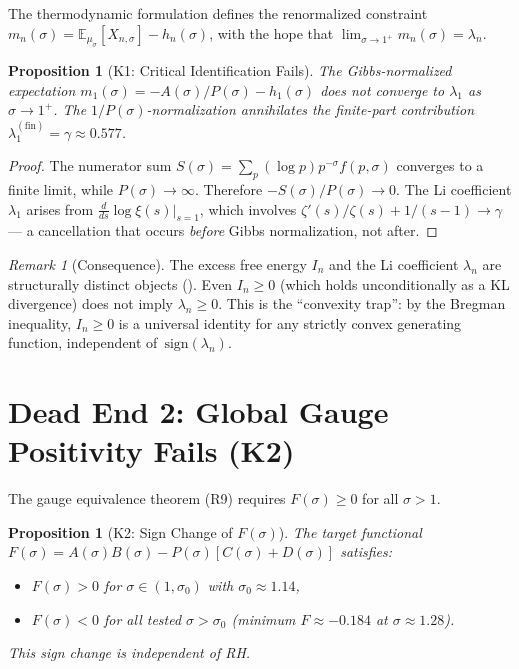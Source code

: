 \documentclass[12pt,a4paper]{article}
\newtheorem{proposition}[theorem]{Proposition}
\theoremstyle{definition}
\theoremstyle{remark}
\newtheorem{remark}[theorem]{Remark}
\newcommand{\EE}{\mathbb{E}}
\newcommand{\muG}{\mu_\sigma}
\begin{document}
The thermodynamic formulation defines the renormalized constraint $m_n(\sigma) = \EE_{\muG}[X_{n,\sigma}] - h_n(\sigma)$, with the hope that $\lim_{\sigma \to 1^+} m_n(\sigma) = \lambda_n$.

\begin{proposition}[K1: Critical Identification Fails]
\label{prop:K1}
The Gibbs-normalized expectation $m_1(\sigma) = -A(\sigma)/P(\sigma) - h_1(\sigma)$ does \emph{not} converge to $\lambda_1$ as $\sigma \to 1^+$. The $1/P(\sigma)$-normalization annihilates the finite-part contribution $\lambda_1^{(\mathrm{fin})} = \gamma \approx 0.577$.
\end{proposition}

\begin{proof}
The numerator sum $S(\sigma) = \sum_p (\log p)p^{-\sigma}f(p,\sigma)$ converges to a finite limit, while $P(\sigma) \to \infty$. Therefore $-S(\sigma)/P(\sigma) \to 0$. The Li coefficient $\lambda_1$ arises from $\frac{d}{ds}\log\xi(s)|_{s=1}$, which involves $\zeta'(s)/\zeta(s) + 1/(s-1) \to \gamma$ --- a cancellation that occurs \emph{before} Gibbs normalization, not after.
\end{proof}

\begin{remark}[Consequence]
The excess free energy $I_n$ and the Li coefficient $\lambda_n$ are structurally distinct objects (). Even $I_n \geq 0$ (which holds unconditionally as a KL divergence) does not imply $\lambda_n \geq 0$. This is the ``convexity trap'': by the Bregman inequality, $I_n \geq 0$ is a universal identity for any strictly convex generating function, independent of~$\mathrm{sign}(\lambda_n)$.
\end{remark}


\section{Dead End 2: Global Gauge Positivity Fails (K2)}
\label{sec:K2}

The gauge equivalence theorem (R9) requires $F(\sigma) \geq 0$ for all $\sigma > 1$.

\begin{proposition}[K2: Sign Change of $F(\sigma)$]
\label{prop:K2}
The target functional $F(\sigma) = A(\sigma)B(\sigma) - P(\sigma)[C(\sigma) + D(\sigma)]$ satisfies:
\begin{itemize}
  \item $F(\sigma) > 0$ for $\sigma \in (1, \sigma_0)$ with $\sigma_0 \approx 1.14$,
  \item $F(\sigma) < 0$ for all tested $\sigma > \sigma_0$ (minimum $F \approx -0.184$ at $\sigma \approx 1.28$).
\end{itemize}
This sign change is independent of RH.
\end{proposition}
\end{document}
